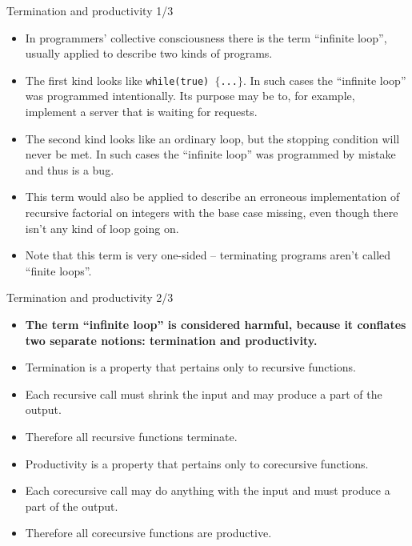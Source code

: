 \documentclass{beamer}
\begin{document}
\begin{frame}{Termination and productivity 1/3}
\begin{itemize}
	\item In programmers' collective consciousness there is the term ``infinite loop'', usually applied to describe two kinds of programs.
	\item The first kind looks like \texttt{while(true) $\lbrace$...$\rbrace$}. In such cases the ``infinite loop'' was programmed intentionally. Its purpose may be to, for example, implement a server that is waiting for requests.
	\item The second kind looks like an ordinary loop, but the stopping condition will never be met. In such cases the ``infinite loop'' was programmed by mistake and thus is a bug.
	\item This term would also be applied to describe an erroneous implementation of recursive factorial on integers with the base case missing, even though there isn't any kind of loop going on.
	\item Note that this term is very one-sided -- terminating programs aren't called ``finite loops''.
\end{itemize}
\end{frame}

\begin{frame}{Termination and productivity 2/3}
\begin{itemize}
	\item \textbf{The term ``infinite loop'' is considered harmful, because it conflates two separate notions: termination and productivity.}
	\item Termination is a property that pertains only to recursive functions.
	\item Each recursive call must shrink the input and may produce a part of the output.
	\item Therefore all recursive functions terminate.
	\item Productivity is a property that pertains only to corecursive functions.
	\item Each corecursive call may do anything with the input and must produce a part of the output.
	\item Therefore all corecursive functions are productive.
\end{itemize}
\end{frame}
\end{document}
